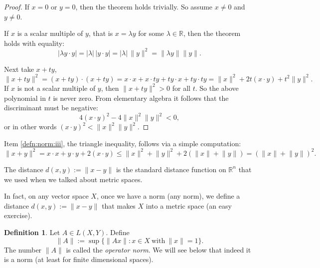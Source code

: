 \documentclass[12pt]{book}
\newcommand{\snorm}[1]{\lVert {#1} \rVert}
\newcommand{\abs}[1]{\left\lvert {#1} \right\rvert}
\newcommand{\R}{{\mathbb{R}}}
\newcommand{\myindex}[1]{#1\index{#1}}
\theoremstyle{plain}
\theoremstyle{remark}
\theoremstyle{definition}
\newtheorem{defn}[thm]{Definition}
\theoremstyle{exercise}
\theoremstyle{example}
\begin{document}
\begin{proof}
If $x=0$ or $y = 0$, then the theorem holds trivially.
So assume $x\not= 0$ and $y \not= 0$.

If $x$ is a scalar multiple of $y$, that is $x = \lambda y$ for some
$\lambda \in \R$, then the theorem holds with equality:
\begin{equation*}
\abs{\lambda y \cdot y} = \abs{\lambda} \, \abs{y\cdot y} =
\abs{\lambda} \, \snorm{y}^2 = \snorm{\lambda y} \snorm{y} .
\end{equation*}

Next take $x+ty$,
\begin{equation*}
\snorm{x+ty}^2 =
(x+ty) \cdot (x+ty) =
x \cdot x + x \cdot ty + ty \cdot x + ty \cdot ty
=
\snorm{x}^2 + 2t(x \cdot y) + t^2 \snorm{y}^2 .
\end{equation*}
If $x$ is not a scalar multiple of $y$, then 
$\snorm{x+ty}^2 > 0$ for all $t$.  So the above polynomial in $t$
is never zero.
From elementary algebra it follows that the discriminant must be negative:
\begin{equation*}
4 {(x \cdot y)}^2 - 4 \snorm{x}^2\snorm{y}^2 < 0,
\end{equation*}
or in other words ${(x \cdot y)}^2 < \snorm{x}^2\snorm{y}^2$.
\end{proof}

Item \ref{defn:norm:iii}, the triangle inequality, follows via a simple computation:
\begin{equation*}
\snorm{x+y}^2 
=
x \cdot x + y \cdot y + 2 (x \cdot y)
\leq
\snorm{x}^2 + \snorm{y}^2 + 2 (\snorm{x}+\snorm{y})
=
{(\snorm{x} + \snorm{y})}^2 .
\end{equation*}

The distance
$d(x,y) := \snorm{x-y}$ is the standard
distance function on $\R^n$ that we used when we talked about metric spaces.

In fact, on any vector space $X$, once we
have a norm (any norm),
we define a distance $d(x,y) := \snorm{x-y}$ that makes $X$ into
a metric space (an easy exercise).

\begin{defn}
Let $A \in L(X,Y)$.  Define
\begin{equation*}
\snorm{A} :=
\sup \{ \snorm{Ax} : x \in X ~ \text{with} ~ \snorm{x} = 1 \} .
\end{equation*}
The number $\snorm{A}$ is called the \emph{\myindex{operator norm}}.  We will see below
that indeed it is a norm (at least for finite dimensional spaces).
\end{defn}
\end{document}
